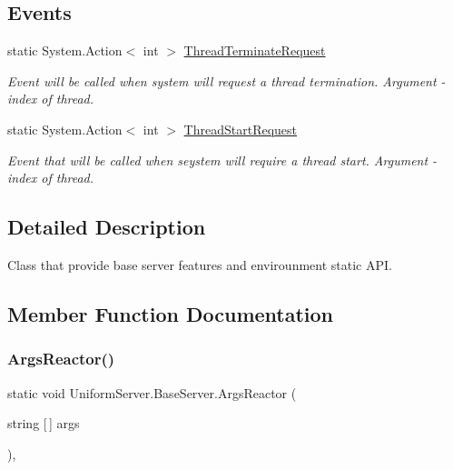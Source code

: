 \subsection*{Events}
\begin{DoxyCompactItemize}
\item 
static System.\+Action$<$ int $>$ \mbox{\hyperlink{class_uniform_server_1_1_base_server_a889c3aaa1cca7f4a9a4e32617516f4be}{Thread\+Terminate\+Request}}
\begin{DoxyCompactList}\small\item\em Event will be called when system will request a thread termination. Argument -\/ index of thread. \end{DoxyCompactList}\item 
static System.\+Action$<$ int $>$ \mbox{\hyperlink{class_uniform_server_1_1_base_server_a440a854a955ab7c5e563918c12e9b32c}{Thread\+Start\+Request}}
\begin{DoxyCompactList}\small\item\em Event that will be called when seystem will require a thread start. Argument -\/ index of thread. \end{DoxyCompactList}\end{DoxyCompactItemize}


\subsection{Detailed Description}
Class that provide base server features and envirounment static A\+PI. 



\subsection{Member Function Documentation}
\mbox{\label{class_uniform_server_1_1_base_server_a992660752da60019c348e18226a87bf2}} 
\subsubsection{\texorpdfstring{Args\+Reactor()}{ArgsReactor()}}
{\footnotesize\ttfamily static void Uniform\+Server.\+Base\+Server.\+Args\+Reactor (\begin{DoxyParamCaption}\item[{string \mbox{[}$\,$\mbox{]}}]{args }\end{DoxyParamCaption})\hspace{0.3cm}{\ttfamily [static]}, {\ttfamily [protected]}}



